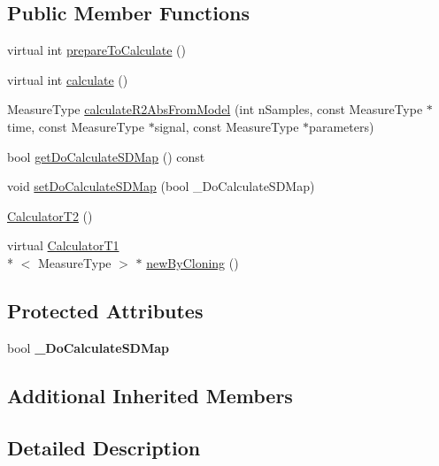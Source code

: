 \subsection*{Public Member Functions}
\begin{DoxyCompactItemize}
\item 
virtual int \hyperlink{class_ox_1_1_calculator_t2_a56e2bcb27465a83dd1a1150b7fe419c8}{prepare\-To\-Calculate} ()
\item 
virtual int \hyperlink{class_ox_1_1_calculator_t2_a8afe4974f3253edea4386a87695607ae}{calculate} ()
\item 
Measure\-Type \hyperlink{class_ox_1_1_calculator_t2_ace5f0515839bdffffb3d60e4536167b6}{calculate\-R2\-Abs\-From\-Model} (int n\-Samples, const Measure\-Type $\ast$time, const Measure\-Type $\ast$signal, const Measure\-Type $\ast$parameters)
\item 
bool \hyperlink{class_ox_1_1_calculator_t2_ab5d0e963ac87d04ae47ecd2a9f10059f}{get\-Do\-Calculate\-S\-D\-Map} () const 
\item 
void \hyperlink{class_ox_1_1_calculator_t2_a5dc0b27caa7a50cca6c63a48f6733b47}{set\-Do\-Calculate\-S\-D\-Map} (bool \-\_\-\-Do\-Calculate\-S\-D\-Map)
\item 
\hyperlink{class_ox_1_1_calculator_t2_a9d0d9d252c322a6db51693ef42c0bed7}{Calculator\-T2} ()
\item 
virtual \hyperlink{class_ox_1_1_calculator_t1}{Calculator\-T1}\\*
$<$ Measure\-Type $>$ $\ast$ \hyperlink{class_ox_1_1_calculator_t2_ab8d7b3bfcf7e6bf745e84cd504a5104b}{new\-By\-Cloning} ()
\end{DoxyCompactItemize}
\subsection*{Protected Attributes}
\begin{DoxyCompactItemize}
\item 
\hypertarget{class_ox_1_1_calculator_t2_abf89edd4cfbf3ca97149ca6d5c4f5bdc}{bool {\bfseries \-\_\-\-Do\-Calculate\-S\-D\-Map}}\label{class_ox_1_1_calculator_t2_abf89edd4cfbf3ca97149ca6d5c4f5bdc}

\end{DoxyCompactItemize}
\subsection*{Additional Inherited Members}


\subsection{Detailed Description}
